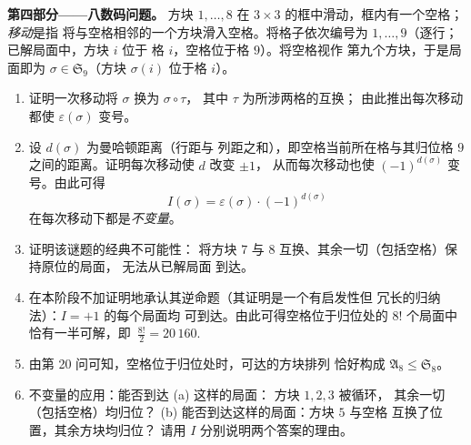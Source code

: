 \begin{problem}
\medskip
\noindent\textbf{第四部分——八数码问题。} 方块 $1, \dots, 8$ 在
$3 \times 3$ 的框中滑动，框内有一个空格；\emph{移动}是指
将与空格相邻的一个方块滑入空格。将格子依次编号为
$1, \dots, 9$（逐行；已解局面中，方块 $i$ 位于
格 $i$，空格位于格 $9$）。将空格视作
第九个方块，于是局面即为 $\sigma \in \mathfrak
S_9$（方块 $\sigma(i)$ 位于格 $i$）。
\begin{enumerate}[resume]
  \item 证明一次移动将 $\sigma$ 换为 $\sigma \circ \tau$，
        其中 $\tau$ 为所涉两格的互换；
        由此推出每次移动都使
        $\varepsilon(\sigma)$ 变号。
  \item 设 $d(\sigma)$ 为曼哈顿距离（行距与
        列距之和），即空格当前所在格与其归位格
        $9$ 之间的距离。证明每次移动使 $d$ 改变 $\pm1$，
        从而每次移动也使 $(-1)^{d(\sigma)}$ 变号。由此可得
        \[
        I(\sigma) = \varepsilon(\sigma)\cdot(-1)^{d(\sigma)}
        \]
        在每次移动下都是\emph{不变量}。
  \item 证明该谜题的经典不可能性：
        将方块 $7$ 与 $8$ 互换、其余一切（包括空格）保持原位的局面，
        无法从已解局面
        到达。
  \item 在本阶段不加证明地承认其逆命题（其证明是一个有启发性但
        冗长的归纳法）：$I = +1$ 的每个局面均
        可到达。由此可得空格位于归位处的 $8!$ 个局面中
        恰有一半可解，即\
        $\frac{8!}2 = 20\,160$.
  \item 由第 20 问可知，空格位于归位处时，可达的方块排列
        恰好构成
         $\mathfrak A_8 \leq \mathfrak S_8$。
  \item 不变量的应用：能否到达 (a) 这样的局面：
        方块 $1, 2, 3$ 被循环，
        其余一切（包括空格）均归位？
        (b) 能否到达这样的局面：方块 $5$ 与空格
        互换了位置，其余方块均归位？
        请用 $I$ 分别说明两个答案的理由。
\end{enumerate}


\end{problem}
